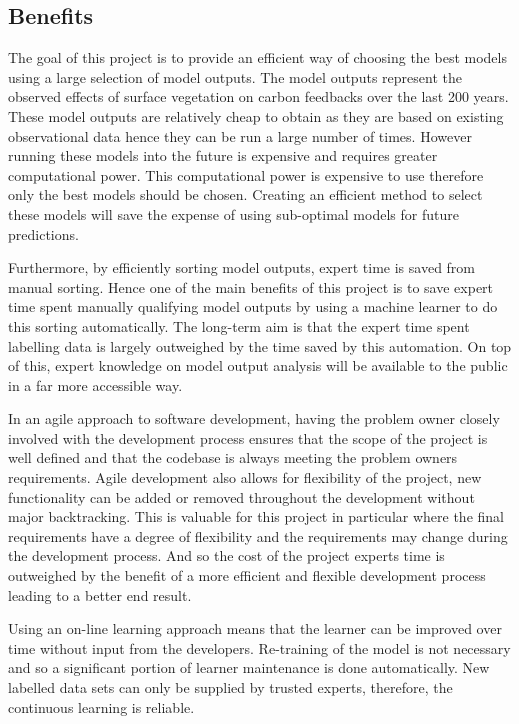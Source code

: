 \documentclass{ecmm427_assignment}
\begin{document}
\subsection{Benefits}
 The goal of this project is to provide an efficient way of choosing the best models using a large selection of model outputs. The model outputs represent the observed effects of surface vegetation on carbon feedbacks over the last 200 years. These model outputs are relatively cheap to obtain as they are based on existing observational data hence they can be run a large number of times. However running these models into the future is expensive and requires greater computational power. This computational power is expensive to use therefore only the best models should be chosen. Creating an efficient method to select these models will save the expense of using sub-optimal models for future predictions.

 Furthermore, by efficiently sorting model outputs, expert time is saved from manual sorting. Hence one of the main benefits of this project is to save expert time spent manually qualifying model outputs by using a machine learner to do this sorting automatically. The long-term aim is that the expert time spent labelling data is largely outweighed by the time saved by this automation. On top of this, expert knowledge on model output analysis will be available to the public in a far more accessible way.

 In an agile approach to software development, having the problem owner closely involved with the development process ensures that the scope of the project is well defined and that the codebase is always meeting the problem owners requirements. Agile development also allows for flexibility of the project, new functionality can be added or removed throughout the development without major backtracking. This is valuable for this project in particular where the final requirements have a degree of flexibility and the requirements may change during the development process. And so the cost of the project experts time is outweighed by the benefit of a more efficient and flexible development process leading to a better end result.

 Using an on-line learning approach means that the learner can be improved over time without input from the developers. Re-training of the model is not necessary and so a significant portion of learner maintenance is done automatically. New labelled data sets can only be supplied by trusted experts, therefore, the continuous learning is reliable.
\end{document}

